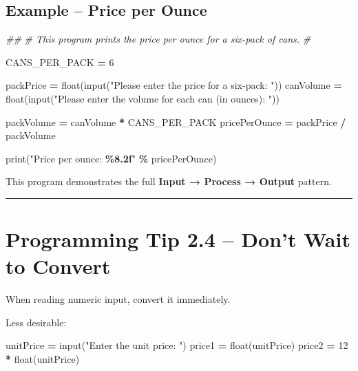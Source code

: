 \documentclass[
]{article}
\newenvironment{Shaded}{\begin{snugshade}}{\end{snugshade}}
\newcommand{\BuiltInTok}[1]{#1}
\newcommand{\CommentTok}[1]{\textcolor[rgb]{0.56,0.35,0.01}{\textit{#1}}}
\newcommand{\DecValTok}[1]{\textcolor[rgb]{0.00,0.00,0.81}{#1}}
\newcommand{\NormalTok}[1]{#1}
\newcommand{\OperatorTok}[1]{\textcolor[rgb]{0.81,0.36,0.00}{\textbf{#1}}}
\newcommand{\SpecialCharTok}[1]{\textcolor[rgb]{0.81,0.36,0.00}{\textbf{#1}}}
\newcommand{\StringTok}[1]{\textcolor[rgb]{0.31,0.60,0.02}{#1}}
\begin{document}
\subsection{Example -- Price per Ounce}\label{example-price-per-ounce}

\begin{Shaded}
\begin{Highlighting}[]
\CommentTok{\#\#}
\CommentTok{\# This program prints the price per ounce for a six{-}pack of cans.}
\CommentTok{\#}

\NormalTok{CANS\_PER\_PACK }\OperatorTok{=} \DecValTok{6}

\NormalTok{packPrice }\OperatorTok{=} \BuiltInTok{float}\NormalTok{(}\BuiltInTok{input}\NormalTok{(}\StringTok{"Please enter the price for a six{-}pack: "}\NormalTok{))}
\NormalTok{canVolume }\OperatorTok{=} \BuiltInTok{float}\NormalTok{(}\BuiltInTok{input}\NormalTok{(}\StringTok{"Please enter the volume for each can (in ounces): "}\NormalTok{))}

\NormalTok{packVolume }\OperatorTok{=}\NormalTok{ canVolume }\OperatorTok{*}\NormalTok{ CANS\_PER\_PACK}
\NormalTok{pricePerOunce }\OperatorTok{=}\NormalTok{ packPrice }\OperatorTok{/}\NormalTok{ packVolume}

\BuiltInTok{print}\NormalTok{(}\StringTok{"Price per ounce: }\SpecialCharTok{\%8.2f}\StringTok{"} \OperatorTok{\%}\NormalTok{ pricePerOunce)}
\end{Highlighting}
\end{Shaded}

This program demonstrates the full \textbf{Input → Process → Output}
pattern.

\begin{center}\rule{0.5\linewidth}{0.5pt}\end{center}

\section{Programming Tip 2.4 -- Don't Wait to
Convert}\label{programming-tip-2.4-dont-wait-to-convert}

When reading numeric input, convert it immediately.

Less desirable:

\begin{Shaded}
\begin{Highlighting}[]
\NormalTok{unitPrice }\OperatorTok{=} \BuiltInTok{input}\NormalTok{(}\StringTok{"Enter the unit price: "}\NormalTok{)}
\NormalTok{price1 }\OperatorTok{=} \BuiltInTok{float}\NormalTok{(unitPrice)}
\NormalTok{price2 }\OperatorTok{=} \DecValTok{12} \OperatorTok{*} \BuiltInTok{float}\NormalTok{(unitPrice)}
\end{Highlighting}
\end{Shaded}
\end{document}
